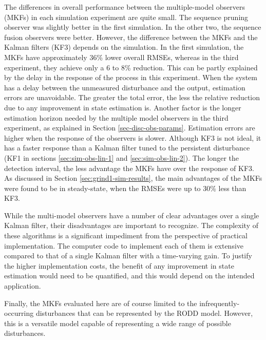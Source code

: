 The differences in overall performance between the multiple-model observers (\acrshort{MKF}s) in each simulation experiment are quite small. The sequence pruning observer was slightly better in the first simulation. In the other two, the sequence fusion observers were better. However, the difference between the \gls{MKF}s and the Kalman filters (KF3) depends on the simulation. In the first simulation, the \gls{MKF}s have approximately 36\% lower overall \gls{RMSE}s, whereas in the third experiment, they achieve only a 6 to 8\% reduction. This can be partly explained by the delay in the response of the process in this experiment. When the system has a delay between the unmeasured disturbance and the output, estimation errors are unavoidable. The greater the total error, the less the relative reduction due to any improvement in state estimation is. Another factor is the longer estimation horizon needed by the multiple model observers in the third experiment, as explained in Section \ref{sec-disc-obs-params}. Estimation errors are higher when the response of the observers is slower. Although KF3 is not ideal, it has a faster response than a Kalman filter tuned to the persistent disturbance (KF1 in sections \ref{sec:sim-obs-lin-1} and \ref{sec:sim-obs-lin-2}). The longer the detection interval, the less advantage the MKFs have over the response of KF3. As discussed in Section \ref{sec:grind1-sim-results}, the main advantages of the \gls{MKF}s were found to be in steady-state, when the \gls{RMSE}s were up to 30\% less than KF3.

While the multi-model observers have a number of clear advantages over a single Kalman filter, their disadvantages are important to recognize. The complexity of these algorithms is a significant impediment from the perspective of practical implementation. The computer code to implement each of them is extensive compared to that of a single Kalman filter with a time-varying gain. To justify the higher implementation costs, the benefit of any improvement in state estimation would need to be quantified, and this would depend on the intended application.

Finally, the MKFs evaluated here are of course limited to the infrequently-occurring disturbances that can be represented by the \gls{RODD} model. However, this is a versatile model capable of representing a wide range of possible disturbances.